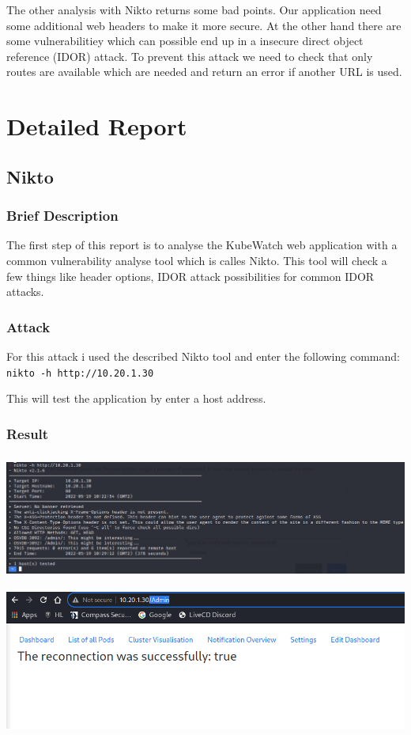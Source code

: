 The other analysis with Nikto returns some bad points. Our application need some additional web headers to make it more secure. At the other hand there are some vulnerabilitiey which can possible end up in a insecure direct object reference (IDOR) attack. To prevent this attack we need to check that only routes are available which are needed and return an error if another URL is used.

\section{Detailed Report}

\subsection{Nikto}
\subsubsection{Brief Description}
The first step of this report is to analyse the KubeWatch web application with a common vulnerability analyse tool which is calles Nikto. This tool will check a few things like header options, IDOR attack possibilities for common IDOR attacks.

\subsubsection{Attack}
For this attack i used the described Nikto tool and enter the following command: \newline
\lstinline "nikto -h http://10.20.1.30"

This will test the application by enter a host address.

\subsubsection{Result}
\includegraphics[height=4.15cm]{resources/security_assessment_2_nikto.png} \newline
\includegraphics[height=5.15cm]{resources/IDOR-attack.png} \newline

